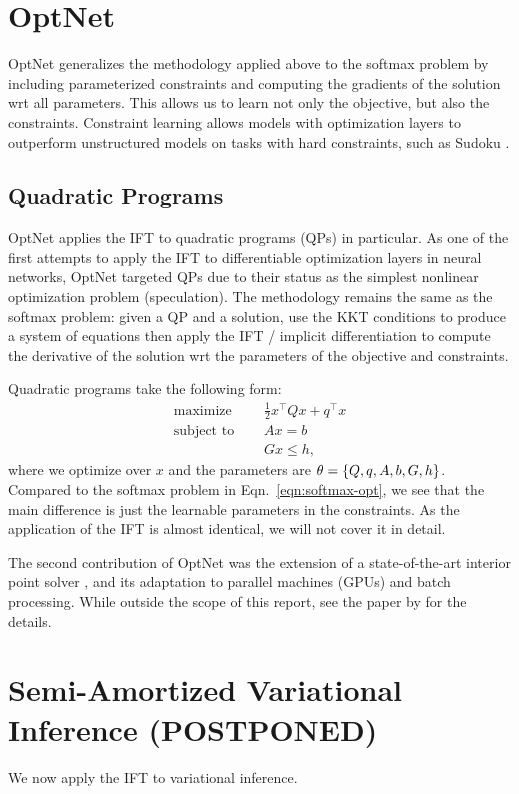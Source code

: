 \documentclass[11pt]{article}
\begin{document}
\section{OptNet}
OptNet generalizes the methodology applied above to the softmax problem by
including parameterized constraints and computing the gradients of the solution
wrt all parameters.
This allows us to learn not only the objective, but also the constraints.
Constraint learning allows models with optimization layers to outperform
unstructured models on tasks with hard constraints, such as Sudoku \citep{optnet}.

\subsection{Quadratic Programs}
OptNet applies the IFT to quadratic programs (QPs) in particular.
As one of the first attempts to apply the IFT to differentiable optimization layers in
neural networks, OptNet targeted QPs due to their status
as the simplest nonlinear optimization problem (speculation).
The methodology remains the same as the softmax problem:
given a QP and a solution,
use the KKT conditions to produce a system of equations then apply the IFT
/ implicit differentiation to compute the derivative of the solution wrt the
parameters of the objective and constraints.

Quadratic programs take the following form:
\begin{equation}
\label{eqn:qp}
\begin{aligned}
\textrm{maximize } \quad & \frac12 x^\top Q x + q^\top x\\
\textrm{subject to } \quad & Ax = b\\
& Gx \leq h,
\end{aligned}
\end{equation}
where we optimize over $x$ and the parameters are $\theta = \left\{Q, q, A, b, G, h\right\}$.
Compared to the softmax problem in Eqn.~\ref{eqn:softmax-opt},
we see that the main difference is just the learnable parameters in the constraints.
As the application of the IFT is almost identical, we will not cover it in detail.

The second contribution of OptNet was the extension of a state-of-the-art interior point
solver \citep{optnet}, and its adaptation to parallel machines (GPUs) and batch processing.
While outside the scope of this report, see the paper by \citet{optnet} for the details.

\section{Semi-Amortized Variational Inference (POSTPONED)}
We now apply the IFT to variational inference.
\end{document}

